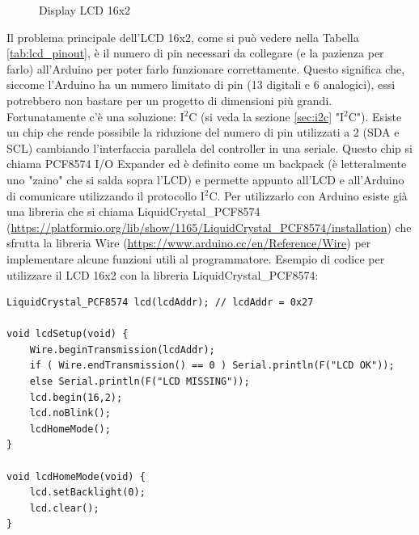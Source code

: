 \documentclass[12pt]{report}
\begin{document}
\begin{figure}
	\caption{Display LCD 16x2}
	\label{fig:16x2}
\end{figure}

Il problema principale dell'LCD 16x2, come si può vedere nella Tabella \ref{tab:lcd_pinout}, è il numero di pin necessari da collegare (e la pazienza per farlo) all'Arduino per poter farlo funzionare correttamente. Questo significa che, siccome l'Arduino ha un numero limitato di pin (13 digitali e 6 analogici), essi potrebbero non bastare per un progetto di dimensioni più grandi. Fortunatamente c'è una soluzione: I$^2$C (si veda la sezione \ref{sec:i2c} "I$^2$C"). Esiste un chip che rende possibile la riduzione del numero di pin utilizzati a 2 (SDA e SCL) cambiando l'interfaccia parallela del controller in una seriale. Questo chip si chiama PCF8574 I/O Expander ed è definito come un backpack (è letteralmente uno "zaino" che si salda sopra l'LCD) e permette appunto all'LCD e all'Arduino di comunicare utilizzando il protocollo I$^2$C. Per utilizzarlo con Arduino esiste già una libreria che si chiama LiquidCrystal\_PCF8574 (\url{https://platformio.org/lib/show/1165/LiquidCrystal_PCF8574/installation}) che sfrutta la libreria Wire (\url{https://www.arduino.cc/en/Reference/Wire}) per implementare alcune funzioni utili al programmatore. Esempio di codice per utilizzare il LCD 16x2 con la libreria LiquidCrystal\_PCF8574:

\begin{lstlisting}
LiquidCrystal_PCF8574 lcd(lcdAddr); // lcdAddr = 0x27

void lcdSetup(void) {
	Wire.beginTransmission(lcdAddr);
	if ( Wire.endTransmission() == 0 ) Serial.println(F("LCD OK"));
	else Serial.println(F("LCD MISSING"));
	lcd.begin(16,2);
	lcd.noBlink();
	lcdHomeMode();
}

void lcdHomeMode(void) {
	lcd.setBacklight(0);
	lcd.clear();
}

\end{lstlisting}
\end{document}
